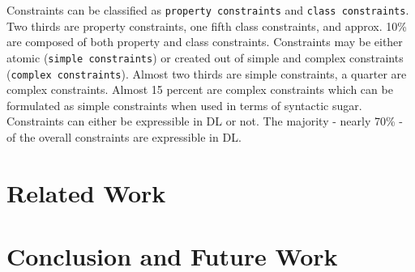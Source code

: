 \documentclass{llncs}
\newcommand{\ms}[1]{\texttt{#1}}
\begin{document}
Constraints can be classified as \ms{property constraints} and \ms{class constraints}.
Two thirds are property constraints, one fifth class constraints, and approx. 10\% are composed of both property and class constraints.
Constraints may be either atomic (\ms{simple constraints}) or created out of simple and complex constraints (\ms{complex constraints}).
Almost two thirds are simple constraints, a quarter are complex constraints.
Almost 15 percent are complex constraints which can be formulated as simple constraints when used in terms of syntactic sugar.
Constraints can either be expressible in DL or not.
The majority - nearly 70\% - of the overall constraints are expressible in DL.	

\section{Related Work}

\section{Conclusion and Future Work}

{}

\setcounter{tocdepth}{1}
\end{document}
